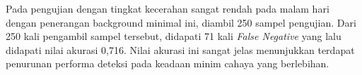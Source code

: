 \par Pada pengujian dengan tingkat kecerahan sangat rendah pada malam hari dengan penerangan background minimal ini, diambil 250 sampel pengujian. Dari 250 kali pengambil sampel tersebut, didapati 71 kali \emph{False Negative} yang lalu didapati nilai akurasi 0,716. Nilai akurasi ini sangat jelas menunjukkan terdapat penurunan performa deteksi pada keadaan minim cahaya yang berlebihan.

